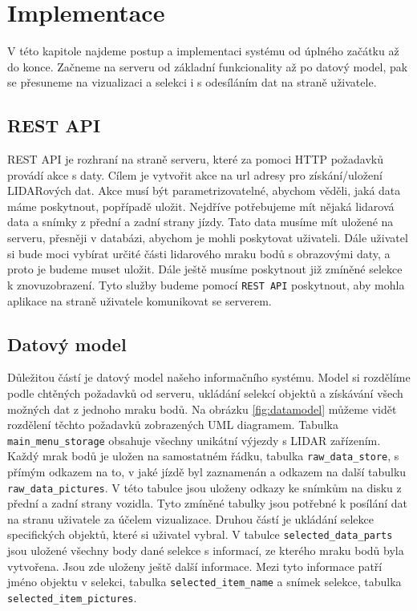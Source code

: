 \documentclass[czech,bachelor,dept420,male,cpdeclaration]{diploma}
\begin{document}
\section{Implementace}
V této kapitole najdeme postup a implementaci systému od úplného začátku až do konce. Začneme na serveru od základní funkcionality až po datový model, pak se přesuneme na vizualizaci a selekci i s odesíláním dat na straně uživatele.


\subsection{REST API} 
REST API je rozhraní na straně serveru, které za pomoci HTTP požadavků provádí akce s daty. Cílem je vytvořit akce na url adresy pro získání/uložení LIDARových dat. Akce musí být parametrizovatelné, abychom věděli, jaká data máme poskytnout, popřípadě uložit. Nejdříve potřebujeme mít nějaká lidarová data a snímky z přední a zadní strany jízdy. Tato data musíme mít uložené na serveru, přesněji v databázi, abychom je mohli poskytovat uživateli. Dále uživatel si bude moci vybírat určité části lidarového mraku bodů s obrazovými daty, a proto je budeme muset uložit. Dále ještě musíme poskytnout již zmíněné selekce k znovuzobrazení. Tyto služby budeme pomocí \texttt{REST API} poskytnout, aby mohla aplikace na straně uživatele komunikovat se serverem.


\subsection{Datový model} 
Důležitou částí je datový model našeho informačního systému. Model si rozdělíme podle chtěných požadavků od serveru, ukládání selekcí objektů a získávání všech možných dat z jednoho mraku bodů. Na obrázku \ref{fig:datamodel} můžeme vidět rozdělení těchto požadavků zobrazených UML diagramem. Tabulka \texttt{main\_menu\_storage} obsahuje všechny unikátní výjezdy s LIDAR zařízením. Každý mrak bodů je uložen na samostatném řádku, tabulka \texttt{raw\_data\_store}, s přímým odkazem na to, v jaké jízdě byl zaznamenán a odkazem na další tabulku \texttt{raw\_data\_pictures}. V této tabulce jsou uloženy odkazy ke snímkům na disku z přední a zadní strany vozidla. Tyto zmíněné tabulky jsou potřebné k posílání dat na stranu uživatele za účelem vizualizace. Druhou částí je ukládání selekce specifických objektů, které si uživatel vybral. V tabulce \texttt{selected\_data\_parts} jsou uložené všechny body dané selekce s informací, ze kterého mraku bodů byla vytvořena. Jsou zde uloženy ještě další informace. Mezi tyto informace patří jméno objektu v selekci, tabulka \texttt{selected\_item\_name} a snímek selekce, tabulka \texttt{selected\_item\_pictures}.
\end{document}
